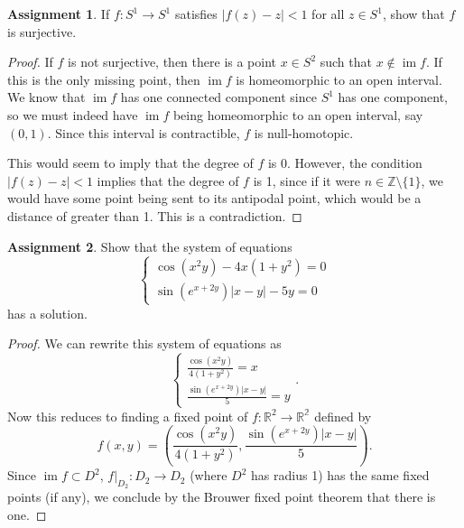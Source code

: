 \documentclass[12pt]{article}
\DeclareMathOperator{\im}{im}
\theoremstyle{definition}
\newtheorem{ex}{Assignment}
\begin{document}
\begin{ex}
	If $f : S^1 \to S^1$ satisfies $|f(z) - z| < 1$ for all $z \in S^1$, show that $f$ is surjective.
\end{ex}
\begin{proof}
	If $f$ is not surjective, then there is a point $x \in S^2$ such that $x \notin \im f$.
	If this is the only missing point, then $\im f$ is homeomorphic to an open interval.
	We know that $\im f$ has one connected component since $S^1$ has one component, so we must indeed have $\im f$ being homeomorphic to an open interval, say $(0, 1)$.
	Since this interval is contractible, $f$ is null-homotopic.

	This would seem to imply that the degree of $f$ is 0.
	However, the condition $|f(z) - z| < 1$ implies that the degree of $f$ is 1, since if it were $n \in \mathbb{Z} \setminus \lbrace 1 \rbrace$, we would have some point being sent to its antipodal point, which would be a distance of greater than 1.
	This is a contradiction.
\end{proof}

\begin{ex}
	Show that the system of equations \begin{equation*}
		\begin{cases}
			\cos(x^2y) - 4x(1+y^2) = 0 \\
			\sin(e^{x+2y})|x-y| - 5y = 0
		\end{cases}
	\end{equation*}
	has a solution.
\end{ex}
\begin{proof}
	We can rewrite this system of equations as \begin{equation*}
		\begin{cases}
			\frac{\cos(x^2y)}{4(1+y^2)} = x \\
			\frac{\sin(e^{x+2y})|x-y|}{5} = y
		\end{cases}.
	\end{equation*}
	Now this reduces to finding a fixed point of $f : \mathbb{R}^2 \to \mathbb{R^2}$ defined by \begin{equation*}
		f(x, y) = \left(\frac{\cos(x^2y)}{4(1+y^2)}, \frac{\sin(e^{x+2y})|x-y|}{5} \right).
	\end{equation*}
  Since $\im f \subset D^2$, $f|_{D_2} : D_2 \to D_2$ (where $D^2$ has radius 1) has the same fixed points (if any), we conclude by the Brouwer fixed point theorem that there is one.
\end{proof}
\end{document}
